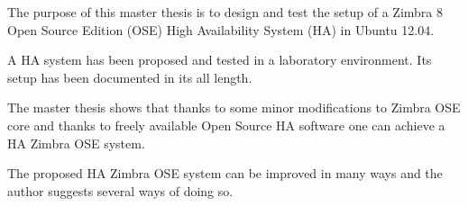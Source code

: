 %
%
%

\noindent       %
The purpose of this master thesis is to design and test the setup of a Zimbra 8 Open Source Edition (OSE) High Availability System (HA) in Ubuntu 12.04.


\vspace*{0.5em}
\noindent       %
A HA system has been proposed and tested in a laboratory environment. Its setup has been documented in its all length.

\vspace*{0.5em}
\noindent       %
The master thesis shows that thanks to some minor modifications to Zimbra OSE core and thanks to freely available Open Source HA software one can achieve a HA Zimbra OSE system.

\vspace*{0.5em}
\noindent       %
The proposed HA Zimbra OSE system can be improved in many ways and the author suggests several ways of doing so.
